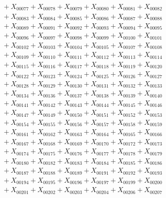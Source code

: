 \documentclass[a4paper,10pt]{article}
\begin{document}
{\begin{align}
&\quad  + X_{00077} + X_{00078} + X_{00079} + X_{00080} + X_{00081} + X_{00082} \\[0.5ex]
&\quad  + X_{00083} + X_{00084} + X_{00085} + X_{00086} + X_{00087} + X_{00088} \\[0.5ex]
&\quad  + X_{00089} + X_{00091} + X_{00092} + X_{00093} + X_{00094} + X_{00095} \\[0.5ex]
&\quad  + X_{00096} + X_{00097} + X_{00098} + X_{00099} + X_{00100} + X_{00101} \\[0.5ex]
&\quad  + X_{00102} + X_{00103} + X_{00104} + X_{00105} + X_{00107} + X_{00108} \\[0.5ex]
&\quad  + X_{00109} + X_{00110} + X_{00111} + X_{00112} + X_{00113} + X_{00114} \\[0.5ex]
&\quad  + X_{00115} + X_{00116} + X_{00117} + X_{00118} + X_{00119} + X_{00120} \\[0.5ex]
&\quad  + X_{00122} + X_{00123} + X_{00124} + X_{00125} + X_{00126} + X_{00127} \\[0.5ex]
&\quad  + X_{00128} + X_{00129} + X_{00130} + X_{00131} + X_{00132} + X_{00133} \\[0.5ex]
&\quad  + X_{00134} + X_{00136} + X_{00137} + X_{00138} + X_{00139} + X_{00140} \\[0.5ex]
&\quad  + X_{00141} + X_{00142} + X_{00143} + X_{00144} + X_{00145} + X_{00146} \\[0.5ex]
&\quad  + X_{00147} + X_{00149} + X_{00150} + X_{00151} + X_{00152} + X_{00153} \\[0.5ex]
&\quad  + X_{00154} + X_{00155} + X_{00156} + X_{00157} + X_{00158} + X_{00159} \\[0.5ex]
&\quad  + X_{00161} + X_{00162} + X_{00163} + X_{00164} + X_{00165} + X_{00166} \\[0.5ex]
&\quad  + X_{00167} + X_{00168} + X_{00169} + X_{00170} + X_{00172} + X_{00173} \\[0.5ex]
&\quad  + X_{00174} + X_{00175} + X_{00176} + X_{00177} + X_{00178} + X_{00179} \\[0.5ex]
&\quad  + X_{00180} + X_{00182} + X_{00183} + X_{00184} + X_{00185} + X_{00186} \\[0.5ex]
&\quad  + X_{00187} + X_{00188} + X_{00189} + X_{00191} + X_{00192} + X_{00193} \\[0.5ex]
&\quad  + X_{00194} + X_{00195} + X_{00196} + X_{00197} + X_{00199} + X_{00200} \\[0.5ex]
&\quad  + X_{00201} + X_{00202} + X_{00203} + X_{00204} + X_{00206} + X_{00207} \\[0.5ex]

\end{align}}
\end{document}
